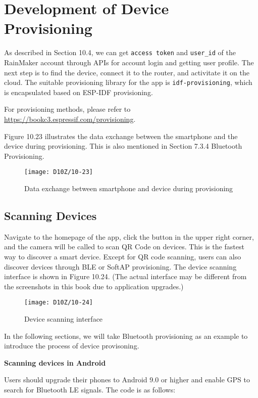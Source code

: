\documentclass[a4paper,12pt]{book}
\begin{document}
\section{Development of Device Provisioning}
As described in Section 10.4, we can get \verb|access token| and \verb|user_id| of the RainMaker account through APIs for account login and getting user profile. The next step is to find the device, connect it to the router, and activitate it on the cloud. The suitable provisioning library for the app is \verb|idf-provisioning|, which is encapsulated based on ESP-IDF provisioning.

For provisioning methods, please refer to \url{https://bookc3.espressif.com/provisioning}.

Figure 10.23 illustrates the data exchange between the smartphone and the device during provisioning. This is also mentioned in Section 7.3.4 Bluetooth Provisioning.

\begin{figure}[ht]
    \centering
    \texttt{[image: D10Z/10-23]}
    \caption{Data exchange between smartphone and device during provisioning}
\end{figure}

\subsection{Scanning Devices}
Navigate to the homepage of the app, click the button in the upper right corner, and the camera will be called to scan QR Code on devices. This is the fastest way to discover a smart device. Except for QR code scanning, users can also discover devices through BLE or SoftAP provisioning. The device scanning interface is shown in Figure 10.24. (The actual interface may be different from the screenshots in this book due to application upgrades.)

\begin{figure}[ht]
    \centering
    \texttt{[image: D10Z/10-24]}
    \caption{Device scanning interface}
\end{figure}

In the following sections, we will take Bluetooth provisioning as an example to introduce the process of device provisoning.

\textbf{Scanning devices in Android}

Users should upgrade their phones to Android 9.0 or higher and enable GPS to search for Bluetooth LE signals. The code is as follows:
\end{document}
